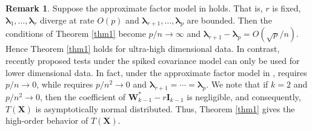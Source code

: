 \documentclass[12pt]{article} %
\newcommand{\bX}{\mathbf{X}}
\newcommand{\bI}{\mathbf{I}}
\newcommand{\bW}{\mathbf{W}}
\newcommand{\bfsym}[1]{\ensuremath{\boldsymbol{#1}}}
\def\blambda {\bfsym {\lambda}}
\theoremstyle{definition}
\newtheorem{remark}{Remark}
\begin{document}
\begin{remark}
    Suppose the approximate factor model in \cite{Fan2013Large} holds.
    That is, $r$ is fixed, $\blambda_1,\ldots, \blambda_r$ diverge at rate $O(p)$ and $\blambda_{r+1},\ldots, \blambda_p$ are bounded.
    Then the conditions of Theorem \ref{thm1} become $p/n\to \infty$ and $\blambda_{r+1}-\blambda_p=O(\sqrt p /n)$.
    Hence Theorem \ref{thm1} holds for ultra-high dimensional data.
    In contrast, recently proposed tests under the spiked covariance model can only be used for lower dimensional data.
    In fact, under the approximate factor model in \cite{Fan2013Large}, \cite{Aoshima2018} requires $p/n \to 0$, while \cite{WANG2018225} requires $p/n^2\to 0$ and $\blambda_{r+1}=\cdots=\blambda_p$.   
    We note that if $k=2$ and $p/n^2 \to 0$, then the coefficient of $\bW_{k-1}^* - r\bI_{k-1}$ is negligible, and consequently, $T(\bX)$ is asymptotically normal distributed.
    Thus, Theorem \ref{thm1} gives the high-order behavior of $T(\bX)$.

\end{remark}
\end{document}
